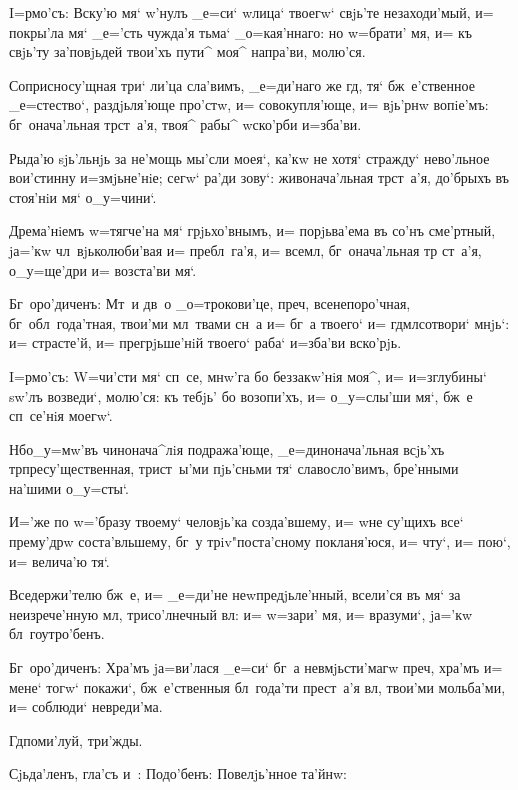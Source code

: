 
I=рмо'съ: Вску'ю мя` w'нулъ _е=си` w\т лица` 
твоегw` свjь'те незаходи'мый, и= покры'ла мя` _е='сть 
чужда'я тьма` _о=кая'ннаго: но w=брати' мя, и= къ свjь'ту 
за'повjьдей твои'хъ пути^ моя^ напра'ви, молю'ся.

Соприсносу'щная три` ли'ца сла'вимъ, _е=ди'наго же 
гд, тя` бж~е'ственное _е=стество`, раздjьля'юще 
про'стw, и= совокупля'юще, и= вjь'рнw вопiе'мъ: 
бг~онача'льная тр ст~а'я, твоя^ рабы^ w\т ско'рби 
и=зба'ви.

Рыда'ю sjь'льнjь за не'мощь мы'сли моея`, ка'кw не 
хотя` стражду` нево'льное вои'стинну и=змjьне'нiе; сегw` 
ра'ди зову`: живонача'льная тр ст~а'я, до'брыхъ въ 
стоя'нiи мя` о_у=чини`.

Дрема'нiемъ w=тягче'на мя` грjьхо'внымъ, и= 
порjьва'ема въ со'нъ сме'ртный, jа='кw чл~вjьколюби'вая 
и= пребл~га'я, и= всемл, бг~онача'льная тр 
ст~а'я, о_у=ще'дри и= возста'ви мя`.

Бг~оро'диченъ: Мт~и дв~о _о=трокови'це, преч, 
всенепоро'чная, бг~обл~года'тная, твои'ми мл~твами сн~а 
и= бг~а твоего` и= гд мл сотвори` мнjь`: и= 
страсте'й, и= прегрjьше'нiй твоего` раба` и=зба'ви 
вско'рjь.


I=рмо'съ: W=чи'сти мя` сп~се, мнw'га бо беззакw'нiя 
моя^, и= и=з\ъ глубины` sw'лъ возведи`, молю'ся: къ 
тебjь' бо возопи'хъ, и= о_у=слы'ши мя`, бж~е сп~се'нiя 
моегw`.

Нб о_у=мw'въ чинонача^лiя подража'юще, 
_е=динонача'льная всjь'хъ тр пресу'щественная, 
трист~ы'ми пjь'сньми тя` славосло'вимъ, бре'нными на'шими 
о_у=сты`.

И='же по w='бразу твоему` человjь'ка созда'вшему, и= 
w\т не су'щихъ все` прему'дрw соста'вльшему, бг~у 
трiv"поста'сному покланя'юся, и= чту`, и= пою`, и= 
велича'ю тя`.

Вседержи'телю бж~е, и= _е=ди'не неwпредjьле'нный, 
всели'ся въ мя` за неизрече'нную мл, трисо'лнечный 
вл: и= w=зари' мя, и= вразуми`, jа='кw 
бл~гоутро'бенъ.

Бг~оро'диченъ: Хра'мъ jа=ви'лася _е=си` бг~а 
невмjьсти'магw преч, хра'мъ и= мене` тогw` покажи`, 
бж~е'ственныя бл~года'ти прест~а'я вл, твои'ми 
мольба'ми, и= соблюди` невреди'ма.

Гд поми'луй, три'жды.

Сjьда'ленъ, гла'съ и~: Подо'бенъ: Повелjь'нное та'йнw:

